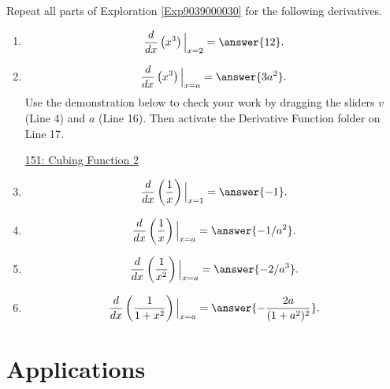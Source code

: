 \documentclass{ximera}
\begin{document}
\begin{exploration} \label{Exp4354567778}
Repeat all parts of Exploration \ref{Exp9039000030} for the following derivatives.

\begin{enumerate}
\item 
\[
      \frac{d}{dx}\left( x^3 \right)\Big|_{x=2} = \answer{12} .
\]

\item
\[
      \frac{d}{dx}\left( x^3 \right)\Big|_{x=a} = \answer{3a^2} .
\]
Use the demonstration below to check your work by dragging the sliders $v$ (Line 4) and $a$ (Line 16). Then activate the Derivative Function folder on Line 17.

\begin{onlineOnly}
    \begin{center}
\end{center}
\end{onlineOnly}

\href{https://www.desmos.com/calculator/ewy7jqij6s}{151: Cubing Function 2}




\item
\[
      \frac{d}{dx}\left( \frac{1}{x} \right)\Big|_{x=1} = \answer{-1} .
\]

\item
\[
      \frac{d}{dx}\left(\frac{1}{x} \right)\Big|_{x=a} = \answer{-1/a^2} .
\]

\item
\[
      \frac{d}{dx}\left(\frac{1}{x^2} \right)\Big|_{x=a} = \answer{-2/a^3} .
\]

\item
\[
      \frac{d}{dx}\left(\frac{1}{1+x^2} \right)\Big|_{x=a} = \answer{-\frac{2a}{(1+a^2)^2}} .
\]

\end{enumerate}

\end{exploration}

\section{Applications}
\end{document}
